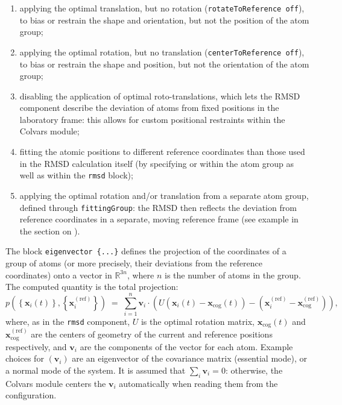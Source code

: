 \begin{enumerate}
\item applying the optimal translation, but no rotation
(\texttt{rotateToReference off}), to bias or restrain the shape and
orientation, but not the position of the atom group;
\item applying the optimal rotation, but no translation
(\texttt{centerToReference off}), to bias or restrain the shape and
position, but not the orientation of the atom group;
\item disabling the application of optimal roto-translations, which
lets the RMSD component describe the deviation of atoms
from fixed positions in the laboratory frame: this allows for custom
positional restraints within the Colvars module;
\item fitting the atomic positions to different reference coordinates
than those used in the RMSD calculation itself
(by specifying  or 
within the atom group as well as within the \texttt{rmsd} block);
\item applying the optimal rotation and/or translation from a separate
atom group, defined through \texttt{fittingGroup}:
the RMSD then reflects the deviation from reference coordinates in a separate, moving
reference frame (see example in the section on ).
\end{enumerate}




The block \texttt{eigenvector~\{...\}} defines the projection of the coordinates
of a group of atoms (or more precisely, their deviations from the
reference coordinates) onto a vector in $\mathbb{R}^{3n}$, where $n$ is the
number of atoms in the group. The computed quantity is the
total projection:
\begin{equation}
  \label{eq:cvc_eigenvector}
  { p\left(\left\{\mathbf{x}_{i}\left(t\right)\right\},
    \left\{\mathbf{x}_{i}^{\mathrm{(ref)}}\right\}\right) } \; = \; {
    \sum_{i=1}^{n}  \mathbf{v}_{i} \cdot
    \left(U(\mathbf{x}_{i}(t) - \mathbf{x}_{\mathrm{cog}}(t)) -
      (\mathbf{x}_{i}^{\mathrm{(ref)}} -
      \mathbf{x}_{\mathrm{cog}}^{\mathrm{(ref)}}) \right)\mathrm{,} }
\end{equation}
where, as in the \texttt{rmsd} component, $U$ is the optimal rotation
matrix, $\mathbf{x}_{\mathrm{cog}}(t)$ and
$\mathbf{x}_{\mathrm{cog}}^{\mathrm{(ref)}}$ are the centers of
geometry of the current and reference positions respectively, and
$\mathbf{v}_{i}$ are the components of the vector for each atom.
Example choices for $(\mathbf{v}_{i})$ are an eigenvector
of the covariance matrix (essential mode), or a normal
mode of the system.  It is assumed that $\sum_{i}\mathbf{v}_{i} = 0$:
otherwise, the Colvars module centers the $\mathbf{v}_{i}$
automatically when reading them from the configuration.

